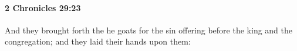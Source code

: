 
		\paragraph{2 Chronicles 29:23} %
			\label{2CHRONICLES-29-23}

			And they brought forth the he goats for the sin offering before the king and the congregation; and they laid their hands upon them:


